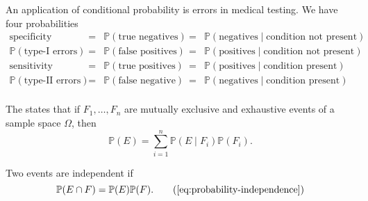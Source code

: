 \documentclass[../main.tex]{subfiles}
\begin{document}
An application of conditional probability is errors in medical testing. We have four probabilities
\[
  \begin{array}{cclcl}
    \text{specificity} 
  &=& \mathbb{P}(\text{true negatives}) 
  &=& \mathbb{P}( \text{negatives} \mid \text{condition not present} ) \\
  \mathbb{P}(\text{type-I errors})
  &=& \mathbb{P}(\text{false positives}) 
  &=& \mathbb{P}( \text{positives} \mid \text{condition not present} ) \\
    \text{sensitivity} 
  &=& \mathbb{P}(\text{true positives}) 
  &=& \mathbb{P}( \text{positives} \mid \text{condition present} ) \\
  \mathbb{P}(\text{type-II errors})
  &=& \mathbb{P}(\text{false negative}) 
  &=& \mathbb{P}( \text{negatives} \mid \text{condition present} ) \\
  \end{array}
\]

The  states that if \(F_{1}, \ldots, F_{n}\) are mutually exclusive and exhaustive events of a sample space \(\Omega\), then 
\[
  \mathbb{P}(E) = \sum_{i=1}^{n} \mathbb{P}(E \mid F_{i}) \mathbb{P}(F_{i}).
\]

Two events are independent if 
\begin{equation}
  \mathbb{P}(E \cap F) = \mathbb{P}(E) \mathbb{P}(F).
  \tag{\ref{eq:probability-independence}}
\end{equation}
\end{document}
